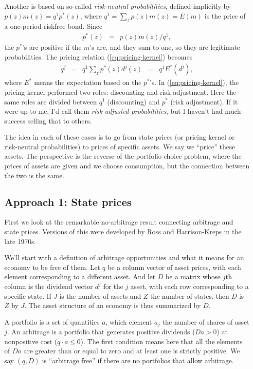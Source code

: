 \documentclass[11pt]{article}
\begin{document}
Another is based on so-called {\it risk-neutral probabilities\/},
defined implicitly by $ p(z) m(z) = q^1 p^*(z) $,
where $q^1 = \sum_z p(z) m(z) = E(m)$ is the price of a one-period riskfree bond.
Since
\begin{eqnarray*}
    p^*(z) &=& p(z) m(z) /q^1 ,
\end{eqnarray*}
the $p^*$'s are positive if the $m$'s are, and they sum to one,
so they are legitimate probabilities.
The pricing relation (\ref{eq:pricing-kernel}) becomes
\begin{eqnarray}
    q^j   &=& q^1 \sum_z p^*(z) d^j(z)  \;\;=\;\; q^1 E^* (d^j) ,
    \label{eq:risk-neutral-probs}
\end{eqnarray}
where $E^*$ means the expectation based on the $p^*$'s.
In (\ref{eq:pricing-kernel}), the pricing kernel performed two roles:
discounting and risk adjustment.
Here the same roles are divided between $q^1$ (discounting)
and $p^*$ (risk adjustment).
If it were up to me, I'd call them {\it risk-adjusted probabilities\/},
but I haven't had much success selling that to others.


The idea in each of these cases is to go from
state prices (or pricing kernel or risk-neutral probabilities)
to prices of specific assets.
We say we ``price'' these assets.
The perspective is the reverse of the portfolio choice problem,
where the prices of assets are given and we choose consumption,
but the connection between the two is the same.


\subsection*{Approach 1:  State prices}

First we look at the remarkable no-arbitrage result
connecting arbitrage and state prices.
Versions of this were developed by
Ross and Harrison-Kreps in the late 1970s.

We'll start with a definition of arbitrage opportunities
and what it means for an economy to be free of them.
Let $q$ be a column vector of asset prices,
with each element corresponding to a different asset.
And let $D$ be a matrix whose $j$th column is the dividend
vector $d^j$ for the $j$ asset,
with each row corresponding to a specific state.
If $J$ is the number of assets and $Z$ the number of states,
then $D$ is $Z$ by $J$.
The asset structure of an economy is thus summarized by $D$.

A portfolio is a set of quantities $a$,
which element $a_j$ the number of shares of asset $j$.
An arbitrage is a portfolio that generates positive dividends ($D a > 0$)
at nonpositive cost ($q \cdot a \leq 0$).
The first condition means here that all the elements
of $Da$ are greater than or equal to zero and at least one is strictly
positive.
We say $(q,D)$ is ``arbitrage free'' if there are no portfolios
that allow arbitrage.
\end{document}
